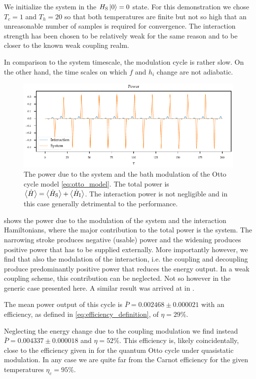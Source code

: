 We initialize the system in the \(H_{\mathrm{S}}\ket{0}=0\) state.  For this
demonstration we chose \(T_{c}=1\) and \(T_{h}=20\) so that both
temperatures are finite but not so high that an unreasonable number of
samples is required for convergence. The interaction strength has been
chosen to be relatively weak for the same reason and to be closer to
the known weak coupling realm.

In comparison to the system timescale, the modulation cycle is rather
slow. On the other hand, the time scales on which \(f\) and \(h_{i}\)
change are not adiabatic.

\begin{figure}[htp]
  \centering
  \includegraphics{figs/otto/power}
  \caption{\label{fig:ottopower} The power due to the system and the
    bath modulation of the Otto cycle model \cref{eq:otto_model}. The
    total power is
    \(\ev{\dot{H}} = \ev{\dot{H}_{\sys}} +
    \ev{\dot{H}_{\inter}}\). The interaction power is not negligible
    and in this case generally detrimental to the performance.}
\end{figure}
 shows the power due to the modulation of the
system and the interaction Hamiltonians, where the major contribution
to the total power is the system. The narrowing stroke produces
negative (usable) power and the widening produces positive power that
has to be supplied externally. More importantly however, we find that
also the modulation of the interaction, i.e. the coupling and
decoupling produce predominantly positive power that reduces the
energy output. In a weak coupling scheme, this contribution can be
neglected. Not so however in the generic case presented here. A
similar result was arrived at in \cite{Wiedmann2021Jun}.

The mean power output of this cycle is
\(\bar{P}=0.002468\pm 0.000021\) with an efficiency, as defined in
\cref{eq:efficiency_definition}, of \(η=29\%\).

Neglecting the energy change due to the coupling modulation we find
instead \(\bar{P}=0.004337\pm 0.000018\) and \(η=52\%\).  This
efficiency is, likely coincidentally, close to the efficiency given in
\cite{Geva1992Feb} for the quantum Otto cycle under quasistatic
modulation. In any case we are quite far from the Carnot efficiency
for the given temperatures \(η_{c}=95\%\).

